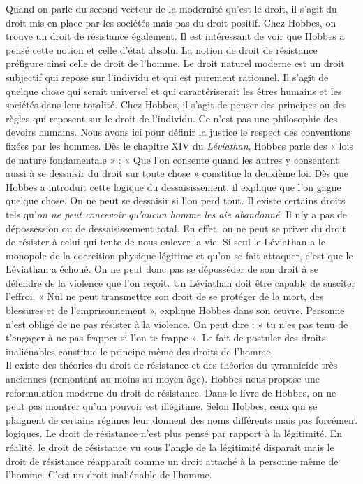 \documentclass[a4paper,11pt]{article}
\begin{document}
	Quand on parle du second vecteur de la modernité qu’est le droit, il s’agit du droit mis en place par les sociétés mais pas du droit positif. Chez Hobbes, on trouve un droit de résistance également.
	Il est intéressant de voir que Hobbes a pensé cette notion et celle d’état absolu. La notion de droit de résistance préfigure ainsi celle de droit de l’homme.
	Le droit naturel moderne est un droit subjectif qui repose sur l’individu et qui est purement rationnel.
	Il s’agit de quelque chose qui serait universel et qui caractériserait les êtres humains et les sociétés dans leur totalité.
	Chez Hobbes, il s’agit de penser des principes ou des règles qui reposent sur le droit de l’individu.
	Ce n’est pas une philosophie des devoirs humains. Nous avons ici pour définir la justice le respect des conventions fixées par les hommes.
	Dès le chapitre XIV du \textit{Léviathan}, Hobbes parle des « lois de nature fondamentale » : « Que l’on consente quand les autres y consentent aussi à se dessaisir du droit sur toute chose » constitue la deuxième loi.
	Dès que Hobbes a introduit cette logique du dessaisissement,  il explique que l’on gagne quelque chose. On ne peut se dessaisir si l’on perd tout.
	Il existe certains droits tels qu’\emph{on ne peut concevoir qu’aucun homme les aie abandonné}.
	Il n’y a pas de dépossession ou de dessaisissement total. En effet, on ne peut se priver du droit de résister à celui qui tente de nous enlever la vie.
	Si seul le Léviathan a le monopole de la coercition physique légitime et qu’on se fait attaquer, c’est que le Léviathan a échoué. On ne peut donc pas se déposséder de son droit à se défendre de la violence que l’on reçoit. Un Léviathan doit être capable de susciter l’effroi.
	« Nul ne peut transmettre son droit de se protéger de la mort, des blessures et de l’emprisonnement », explique Hobbes dans son œuvre.
	Personne n’est obligé de ne pas résister à la violence.
	On peut dire : « tu n’es pas tenu de t’engager à ne pas frapper si l’on te frappe ». Le fait de postuler des droits inaliénables constitue le principe même des droits de l’homme.\\


	Il existe des théories du droit de résistance et des théories du tyrannicide très anciennes (remontant au moins au moyen-âge). Hobbes nous propose une reformulation moderne du droit de résistance. Dans le livre de Hobbes, on ne peut pas montrer qu’un pouvoir est illégitime. Selon Hobbes, ceux qui se plaignent de certains régimes leur donnent des noms différents mais pas forcément logiques. Le droit de résistance n’est plus pensé par rapport à la légitimité. En réalité, le droit de résistance vu sous l’angle de la légitimité disparaît mais le droit de résistance réapparaît comme un droit attaché à la personne même de l’homme. C’est un droit inaliénable de l’homme.
	
\end{document}
